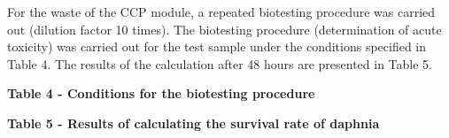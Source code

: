For the waste of the CCP module, a repeated biotesting procedure was
carried out (dilution factor 10 times). The biotesting procedure
(determination of acute toxicity) was carried out for the test sample
under the conditions specified in Table 4. The results of the
calculation after 48 hours are presented in Table 5.

{\bfseries Table 4 - Conditions for the biotesting procedure}


{\bfseries Table 5 - Results of calculating the survival rate of daphnia}

